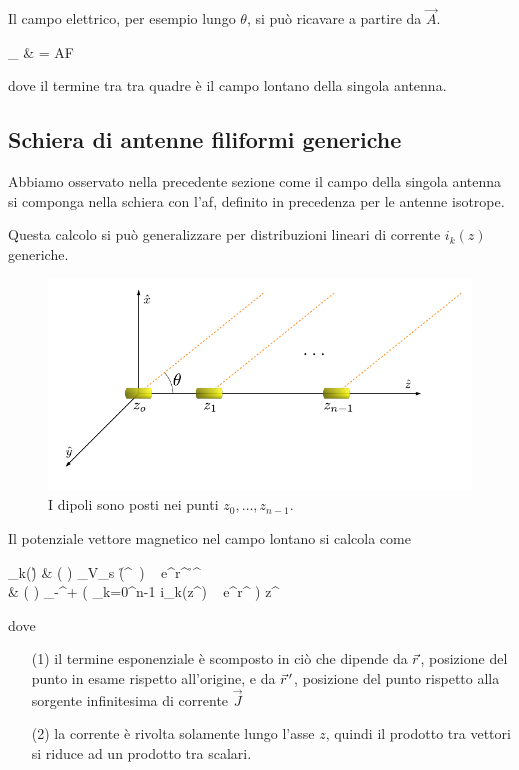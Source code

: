 		Il campo elettrico, per esempio lungo $\theta$, si può ricavare a partire da $\vec{A}$.
		\begin{esp}
			_\theta
			& =  AF
		\end{esp}
		dove il termine tra tra quadre è il campo lontano della singola antenna.

	\subsection{Schiera di antenne filiformi generiche}
		Abbiamo osservato nella precedente sezione come il campo della singola antenna si componga nella schiera con l'\gls{af}, definito in precedenza per le antenne isotrope.

		Questa calcolo si può generalizzare per distribuzioni lineari di corrente $i_k(z)$ generiche.

		\begin{figure}[ht]
			\centering
			\includegraphics{img/schiera_non_isotropa_dipoli.pdf}
			\caption{I dipoli sono posti nei punti $z_0, \ldots, z_{n-1}$.}
			\label{fig:schiera_non_isotropa_dipoli}
		\end{figure}

		Il potenziale vettore magnetico nel campo lontano si calcola come
		\begin{esp}
			\vec{A}_k(\r)
				&  \frac{\mu}{4\pi}
				\left( \frac{e^{-\jmath \beta r}}{r} \right)
				\int_{V_s} (\r^{\, \prime})
					~ e^{\jmath \beta r^\prime \cos \theta} \de \r^{\, \prime} \\
				&  \frac{\mu}{4\pi}
				\left(  \right) \hat{z}
				\int_{-\infty}^{+\infty}
					\left( \sum_{k=0}^{n-1} i_k(z^\prime) ~ e^{\jmath \beta r^\prime \cos \theta} \right)
					\de z^\prime
		\end{esp}
		dove
		\begin{itemize}
			\item[(1)] il termine esponenziale è scomposto in ciò che dipende da $\vec{r}$, posizione del punto in esame rispetto all'origine, e da $\vec{r}^{\,\prime}$, posizione del punto rispetto alla sorgente infinitesima di corrente $\vec{J}$
			\item[(2)] la corrente è rivolta solamente lungo l'asse $z$, quindi il prodotto tra vettori si riduce ad un prodotto tra scalari.
		\end{itemize}

